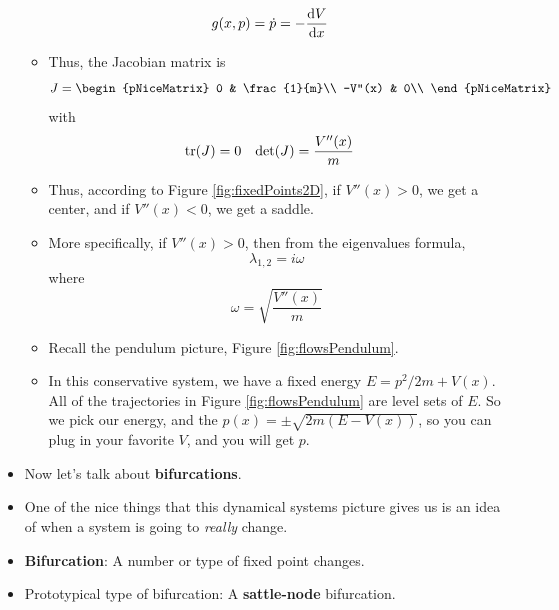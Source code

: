 \documentclass[../notes.tex]{subfiles}
\begin{document}
\begin{itemize}
\begin{itemize}
\begin{align*}
            g(x,p) &= \dot{p} = -\dv{V}{x}
        \end{align*}
        \item Thus, the Jacobian matrix is
        \begin{equation*}
            J =
            \begin{pNiceMatrix}
                0 & \frac{1}{m}\\
                -V''(x) & 0\\
            \end{pNiceMatrix}
        \end{equation*}
        with
        \begin{align*}
            \tr(J) &= 0&
            \det(J) &= \frac{V''(x)}{m}
        \end{align*}
        \item Thus, according to Figure \ref{fig:fixedPoints2D}, if $V''(x)>0$, we get a center, and if $V''(x)<0$, we get a saddle.
        \item More specifically, if $V''(x)>0$, then from the eigenvalues formula,
        \begin{equation*}
            \lambda_{1,2} = i\omega
        \end{equation*}
        where
        \begin{equation*}
            \omega = \sqrt{\frac{V''(x)}{m}}
        \end{equation*}
        \item Recall the pendulum picture, Figure \ref{fig:flowsPendulum}.
        \item In this conservative system, we have a fixed energy $E=p^2/2m+V(x)$. All of the trajectories in Figure \ref{fig:flowsPendulum} are level sets of $E$. So we pick our energy, and the $p(x)=\pm\sqrt{2m(E-V(x))}$, so you can plug in your favorite $V$, and you will get $p$.
    \end{itemize}
    \item Now let's talk about \textbf{bifurcations}.
    \item One of the nice things that this dynamical systems picture gives us is an idea of when a system is going to \emph{really} change.
    \item \textbf{Bifurcation}: A number or type of fixed point changes.
    \item Prototypical type of bifurcation: A \textbf{sattle-node} bifurcation.
    \begin{figure}[h!]
        \centering
        \begin{subfigure}[b]{0.2\linewidth}

\end{subfigure}
\end{figure}
\end{itemize}
\end{document}
